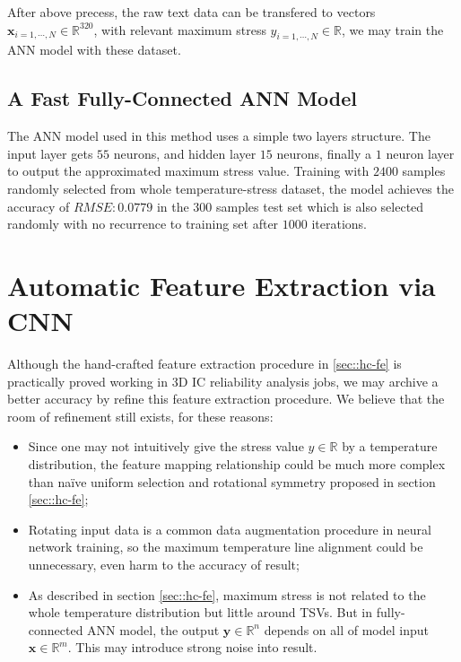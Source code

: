 After above precess, the raw text data can be transfered to vectors 
$\mathbf{x}_{i=1,\cdots,N} \in \mathbb{R}^{320}$, with relevant maximum stress 
$y_{i=1,\cdots,N} \in \mathbb{R}$,
we may train the ANN model with these dataset.

\subsection{A Fast Fully-Connected ANN Model}
The ANN model used in this method uses a simple two layers structure. 
The input layer gets $55$ neurons, and hidden layer $15$ neurons, finally a $1$ neuron layer
to output the approximated maximum stress value.
Training with $2400$ samples randomly selected from whole temperature-stress dataset,
the model achieves the accuracy of $RMSE: 0.0779$ in the $300$ samples test set 
which is also selected randomly with no recurrence to training set after $1000$ iterations.

\section{Automatic Feature Extraction via CNN}
Although the hand-crafted feature extraction procedure in \ref{sec::hc-fe} is 
practically proved working in 3D IC reliability analysis jobs,
we may archive a better accuracy by refine this feature extraction procedure.
We believe that the room of refinement still exists, for these reasons:
\begin{itemize}
    \item Since one may not intuitively give the stress value $y\in\mathbb{R}$
    by a temperature distribution, the feature mapping relationship could be
    much more complex than na\"ive uniform selection and rotational symmetry proposed
    in section \ref{sec::hc-fe};
    \item Rotating input data is a common data augmentation procedure in neural
    network training\cite{Goodfellow2016Deep}, 
    so the maximum temperature line alignment could be unnecessary,
    even harm to the accuracy of result;
    \item As described in section \ref{sec::hc-fe}, maximum stress is not related to
    the whole temperature distribution but little around TSVs. But in fully-connected
    ANN model, the output $\mathbf{y}\in\mathbb{R}^n$ depends on all of model input 
    $\mathbf{x}\in\mathbb{R}^m$. This may introduce strong noise into result.
\end{itemize}

